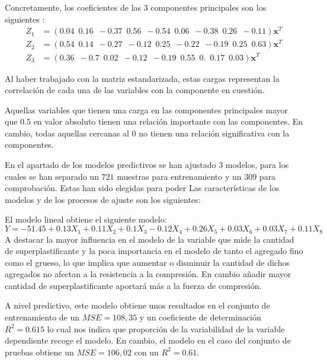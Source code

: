 \noindent Concretamente, los coeficientes de las 3 componentes principales son los siguientes :
\begin{align}
Z_1&=(0.04 \enspace 0.16  \enspace  -0.37  \enspace 0.56  \enspace   -0.54  \enspace  0.06 \enspace  -0.38  \enspace 0.26  \enspace -0.11)\mathbf{x}^T\\
Z_2&=(0.54 \enspace 0.14 \enspace  -0.27  \enspace -0.12 \enspace   0.25  \enspace -0.22 \enspace  -0.19 \enspace  0.25  \enspace  0.63)\mathbf{x}^T\\
Z_3&=(0.36 \enspace -0.7 \enspace  0.02 \enspace-0.12\enspace -0.19  \enspace 0.55 \enspace 0. \enspace   0.17 \enspace 0.03)\mathbf{x}^T
\end{align}

\noindent Al haber trabajado con la matriz estandarizada, estas cargas representan la correlación de cada una de las variables con la componente en cuestión. 

\noindent Aquellas variables que tienen una carga en las componentes principales mayor que $0.5$ en valor absoluto tienen una relación importante con las componentes. En cambio, todas aquellas cercanas al $0$ no tienen una relación significativa con la componentes. 

\noindent En el apartado de los modelos predictivos se han ajustado 3 modelos, para los cuales se han separado un $721$ muestras para entrenamiento y un $309$ para comprobación. Estas han sido elegidas para poder  
\noindent Las características de los modelos y de los procesos de ajuste son los siguientes:

\noindent El modelo lineal obtiene el siguiente modelo: \begin{equation}
Y=-51.45+0.13 X_1+0.11X_2+0.1X_3-0.12X_4+0.26X_5+  0.03X_6+0.03X_7+0.11X_8
\end{equation}
\noindent A destacar la mayor influencia en el modelo de la variable que mide la cantidad de superplastificante y la poca importancia en el modelo de tanto el agregado fino como el grueso, lo que implica que aumentar o disminuir la cantidad de dichos agregados no afectan a la resistencia a la compresión. En cambio añadir mayor cantidad de superplastificante aportará más a la fuerza de compresión.
  
\noindent A nivel predictivo, este modelo obtiene unos resultados en el conjunto de entrenamiento de un $MSE=108,35$ y un coeficiente de determinación $R^2=0.615$ lo cual nos indica que proporción de la variabilidad de la variable dependiente recoge el modelo. En cambio, el modelo en el caso del conjunto de pruebas obtiene un $MSE=106,02$ con un $R^2=0.61$. 

